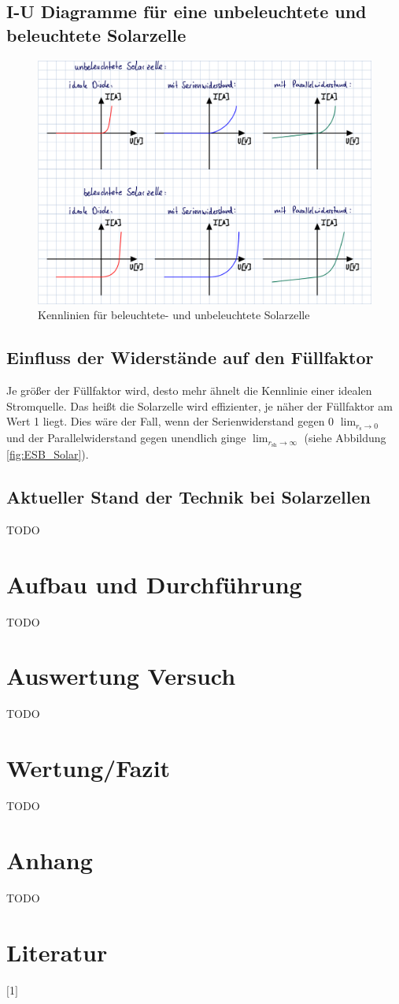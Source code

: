 \documentclass[a4paper]{scrartcl}
\numberwithin{equation}{subsection}
\begin{document}
\subsection{I-U Diagramme für eine unbeleuchtete und beleuchtete Solarzelle}

\begin{figure}[H]
\includegraphics[width=14cm]{Kennlinie}
\centering
\caption{Kennlinien für beleuchtete- und unbeleuchtete Solarzelle}
\centering
\label{fig:Kennlinien}
\end{figure}

\subsection{Einfluss der Widerstände auf den Füllfaktor}
Je größer der Füllfaktor wird, desto mehr ähnelt die Kennlinie einer idealen Stromquelle. Das heißt die
Solarzelle wird effizienter, je näher der Füllfaktor am Wert 1 liegt. Dies wäre der Fall, wenn
der Serienwiderstand gegen 0 $\lim_{r_{\text{s}} \to 0}$ und der Parallelwiderstand gegen unendlich ginge
$\lim_{r_{\text{sh}} \to \infty}$ (siehe Abbildung \ref{fig:ESB_Solar}).

\subsection{Aktueller Stand der Technik bei Solarzellen}
TODO

\newpage
\section{Aufbau und Durchführung}
TODO

\newpage
\section{Auswertung Versuch}
TODO

\newpage
\section{Wertung/Fazit}
TODO

\newpage
\section{Anhang}
TODO

\newpage
\section{Literatur}
$[$1$]$ 


\label{LastPage}
\end{document}
